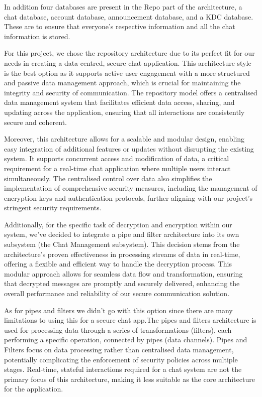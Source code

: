 \documentclass[]{article}
\begin{document}
In addition four databases are present in the Repo part of the architecture, a chat database, account database, announcement database, and a KDC database. These are to ensure that everyone’s respective information and all the chat information is stored.
\medskip

For this project, we chose the repository architecture due to its perfect fit for our needs in creating a data-centred, secure chat application. This architecture style is the best option as it supports active user engagement with a more structured and passive data management approach, which is crucial for maintaining the integrity and security of communication. The repository model offers a centralised data management system that facilitates efficient data access, sharing, and updating across the application, ensuring that all interactions are consistently secure and coherent.
\medskip

Moreover, this architecture allows for a scalable and modular design, enabling easy integration of additional features or updates without disrupting the existing system. It supports concurrent access and modification of data, a critical requirement for a real-time chat application where multiple users interact simultaneously. The centralised control over data also simplifies the implementation of comprehensive security measures, including the management of encryption keys and authentication protocols, further aligning with our project's stringent security requirements.
\medskip

Additionally, for the specific task of decryption and encryption within our system, we've decided to integrate a pipe and filter architecture into its own subsystem (the Chat Management subsystem). This decision stems from the architecture's proven effectiveness in processing streams of data in real-time, offering a flexible and efficient way to handle the decryption process. This modular approach allows for seamless data flow and transformation, ensuring that decrypted messages are promptly and securely delivered, enhancing the overall performance and reliability of our secure communication solution.
\medskip

As for pipes and filters we didn’t go with this option since there are many limitations to using this for a secure chat app.The pipes and filters architecture is used for processing data through a series of transformations (filters), each performing a specific operation, connected by pipes (data channels). Pipes and Filters focus on data processing rather than centralised data management, potentially complicating the enforcement of security policies across multiple stages. Real-time, stateful interactions required for a chat system are not the primary focus of this architecture, making it less suitable as the core architecture for the application.
\medskip
\end{document}
